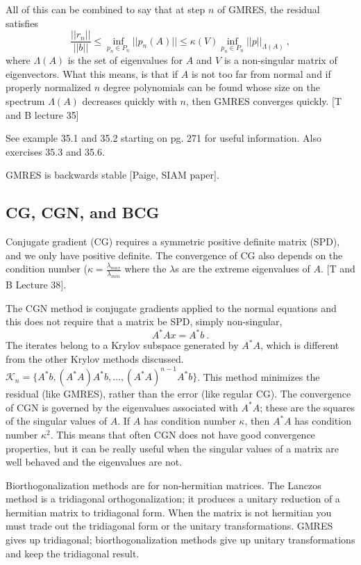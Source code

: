 \documentclass[12pt,twoside]{book}
\begin{document}
All of this can be combined to say that at step $n$ of GMRES, the residual satisfies
%
\begin{equation}
  \frac{||r_{n}||}{||b||} \le \inf_{p_{n}\in P_{n}} ||p_{n}(A)|| \le \kappa(V)  \inf_{p_{n}\in P_{n}} ||p||_{\Lambda(A)} \:,
\end{equation}
%
where $\Lambda(A)$ is the set of eigenvalues for $A$ and $V$ is a non-singular matrix of eigenvectors. What this means, is that if $A$ is not too far from normal and if properly normalized $n$ degree polynomials can be found whose size on the spectrum $\Lambda(A)$ decreases quickly with $n$, then GMRES converges quickly. [T and B lecture 35]

See example 35.1 and 35.2 starting on pg. 271 for useful information. Also exercises 35.3 and 35.6.

GMRES is backwards stable [Paige, SIAM paper].



\subsection{CG, CGN, and BCG}
Conjugate gradient (CG) requires a symmetric positive definite matrix (SPD), and we only have positive definite. The convergence of CG also depends on the condition number ($\kappa = \frac{\lambda_{max}}{\lambda_{min}}$ where the $\lambda$s are the extreme eigenvalues of $A$. [T and B Lecture 38].
 
The CGN method is conjugate gradients applied to the normal equations and this does not require that a matrix be SPD, simply non-singular, 
 \begin{equation}
   A^{*}Ax = A^{*}b \:.
 \end{equation}
The iterates belong to a Krylov subspace generated by $A^{*}A$, which is different from the other Krylov methods discussed. $\mathcal{K}_{n} = \{A^{*}b, (A^{*}A)A^{*}b, \hdots, (A^{*}A)^{n-1}A^{*}b\}$. This method minimizes the residual (like GMRES), rather than the error (like regular CG). The convergence of CGN is governed by the eigenvalues associated with $A^{*}A$; these are the squares of the singular values of $A$. If $A$ has condition number $\kappa$, then $A^{*}A$ has condition number $\kappa^{2}$. This means that often CGN does not have good convergence properties, but it can be really useful when the singular values of a matrix are well behaved and the eigenvalues are not.
 
Biorthogonalization methods are for non-hermitian matrices. The Lanczos method is a tridiagonal orthogonalization; it produces a unitary reduction of a hermitian matrix to tridiagonal form. When the matrix is not hermitian you must trade out the tridiagonal form or the unitary transformations. GMRES gives up tridiagonal; biorthogonalization methods give up unitary transformations and keep the tridiagonal result.
 
\end{document}
